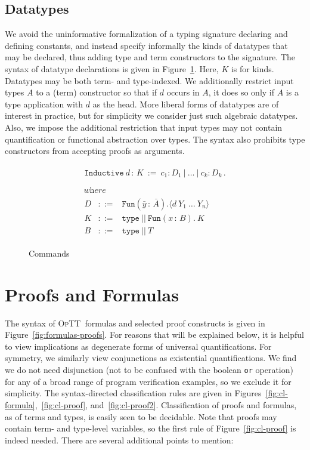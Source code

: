 \documentclass{fundam}
\newcommand{\optt}{\textsc{OpTT}}
\begin{document}
\subsection{Datatypes}
\label{sec:commands}

We avoid the uninformative formalization of a typing signature
declaring and defining constants, and instead specify informally the
kinds of datatypes that may be declared, thus adding type and term
constructors to the signature.  The syntax of datatype declarations is
given in Figure~\ref{fig:command}.  Here, $K$ is for kinds.  Datatypes
may be both term- and type-indexed.  We additionally restrict input
types $A$ to a (term) constructor so that if $d$ occurs in $A$, it
does so only if $A$ is a type application with $d$ as the head.  More
liberal forms of datatypes are of interest in practice, but for
simplicity we consider just such algebraic datatypes.  Also, we impose
the additional restriction that input types may not contain
quantification or functional abstraction over types.  The syntax also
prohibits type constructors from accepting proofs as arguments.

\begin{figure}
\[
\begin{array}{l} 
\begin{array}{lll}
\texttt{Inductive}\ d\, :\, K \ := \ c_1 : D_1\ |\ \ldots\ |\ c_k : D_k\, .
\end{array}
\\ \\ 
\textit{\ \ where}\\
\begin{array}{lll}
D & ::= & \texttt{Fun}(\bar{y}\,:\,\bar{A}) . \langle  d\ Y_1\ \ldots\ Y_n\rangle
\\
K & ::= & \texttt{type}\ ||\ \texttt{Fun}(x\,:\,B).\ K
\\ 
B & ::= & \texttt{type}\ ||\ T
\end{array}
\end{array}
\]
\caption{\label{fig:command}Commands}
\end{figure}

\section{Proofs and Formulas}
\label{sec:pfs}

The syntax of \optt\ formulas and selected proof constructs is given
in Figure~\ref{fig:formulas-proofs}.  For reasons that will be
explained below, it is helpful to view implications as degenerate
forms of universal quantifications.  For symmetry, we similarly view
conjunctions as existential quantifications.  We find we do not need
disjunction (not to be confused with the boolean \texttt{or}
operation) for any of a broad range of program verification examples,
so we exclude it for simplicity.  The syntax-directed classification
rules are given in Figures~\ref{fig:cl-formula},~\ref{fig:cl-proof},
and~\ref{fig:cl-proof2}.  Classification of proofs and formulas, as of
terms and types, is easily seen to be decidable.  Note that proofs may
contain term- and type-level variables, so the first rule of
Figure~\ref{fig:cl-proof} is indeed needed.  There are several
additional points to mention:
\end{document}
